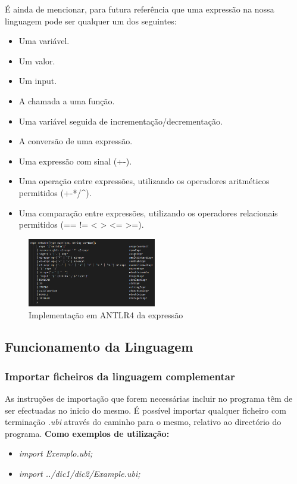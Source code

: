 \documentclass[10pt,portuguese]{article}
\begin{document}
\par É ainda de mencionar, para futura referência que uma expressão na nossa linguagem pode ser qualquer um dos seguintes:
\begin{itemize}
    \item Uma variável.
	\item Um valor.
	\item Um input.
    \item A chamada a uma função.
	\item Uma variável seguida de incrementação/decrementação.
	\item A conversão de uma expressão.
	\item Uma expressão com sinal (+-).
	\item Uma operação entre expressões, utilizando os operadores aritméticos permitidos (+-*/\string^).
	\item Uma comparação entre expressões, utilizando os operadores relacionais permitidos (== != < > <= >=).
\end{itemize}
\begin{figure}[h]
\centering
\includegraphics[width=0.5\textwidth]{images/expr.png}
\caption{Implementação em ANTLR4 da expressão}
\end{figure}
\subsection{Funcionamento da Linguagem}

\subsubsection{Importar ficheiros da linguagem complementar}
\par As instruções de importação que forem necessárias incluir no programa têm de ser efectuadas no inicio do mesmo. É possível importar qualquer ficheiro com terminação \emph{.ubi} através do caminho para o mesmo, relativo ao directório do programa.
\textbf{Como exemplos de utilização:}

\begin{itemize}
    \item \textit{import Exemplo.ubi;}
    \item \textit{import ../dic1/dic2/Example.ubi;}
\end{itemize}
\end{document}
